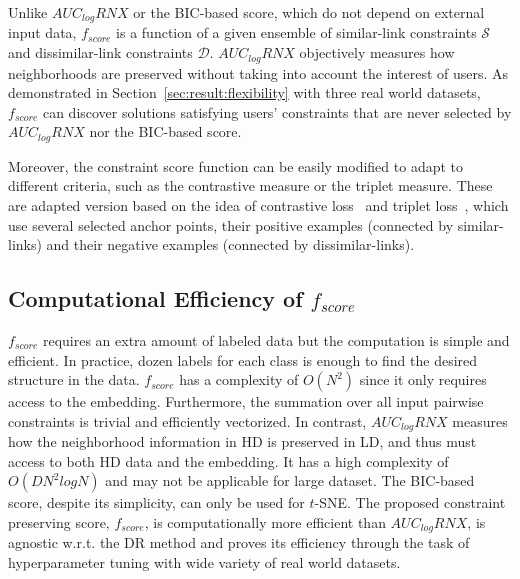 Unlike $AUC_{log}RNX$ or the BIC-based score, which do not depend on external input data, $f_{score}$ is a function of a given ensemble of similar-link constraints $\mathcal{S}$ and dissimilar-link constraints $\mathcal{D}$.
$AUC_{log}RNX$ objectively measures how neighborhoods are preserved without taking into account the interest of users.
As demonstrated in Section~\ref{sec:result:flexibility} with three real world datasets, $f_{score}$ can discover solutions satisfying users' constraints that are never selected by $AUC_{log}RNX$ nor the BIC-based score.

Moreover, the constraint score function can be easily modified to adapt to different criteria, such as the contrastive measure or the triplet measure.
These are adapted version based on the idea of contrastive loss~\cite{logeswaran2018efficient} and triplet loss~\cite{schroff2015facenet}, which use several selected anchor points, their positive examples (connected by similar-links) and their negative examples (connected by dissimilar-links).

\subsection{Computational Efficiency of $f_{score}$}

$f_{score}$ requires an extra amount of labeled data but the computation is simple and efficient.
In practice, dozen labels for each class is enough to find the desired structure in the data.
$f_{score}$ has a complexity of $O(N^2)$ since it only requires access to the embedding.
Furthermore, the summation over all input pairwise constraints is trivial and efficiently vectorized.
In contrast, $AUC_{log}RNX$ measures how the neighborhood information in HD is preserved in LD, and thus must access to both HD data and the embedding.
It has a high complexity of $O(DN^2logN)$ and may not be applicable for large dataset.
The BIC-based score, despite its simplicity, can only be used for $t$-SNE.
The proposed constraint preserving score, $f_{score}$, is computationally more efficient than $AUC_{log}RNX$, is agnostic w.r.t. the DR method and proves its efficiency through the task of hyperparameter tuning with wide variety of real world datasets.

